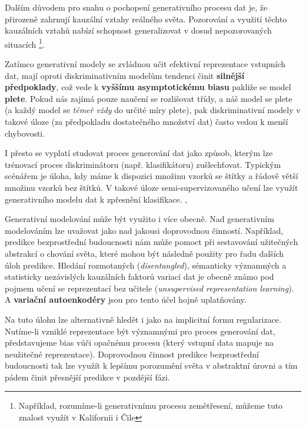 Dalším důvodem pro snahu o pochopení generativního procesu dat je, že přirozeně zahrnují kauzální vztahy reálného světa.
Pozorování a využití těchto kauzálních vztahů nabízí schopnost generalizovat v dosud nepozorovaných situacích
\footnote{Například, rozumíme-li generativnímu procesu zemětřesení, můžeme tuto znalost využít v Kalifornii i Čile}.

Zatímco generativní modely se zvládnou učit efektivní reprezentace vstupních dat, mají oproti diskriminativním modelům tendenci činit \textbf{silnější předpoklady}, což vede k \textbf{vyššímu asymptotickému biasu} pakliže se model \textbf{plete}. \cite{Banerjee2007}
Pokud nás zajímá pouze naučení se rozlišovat třídy, a náš model se plete (a každý model se \emph{témeř vždy} do určité míry plete), pak diskriminativní modely v takové úloze (za předpokladu dostatečného množství dat) často vedou k menší chybovosti.

I přesto se vyplatí studovat proces generování dat jako způsob, kterým lze trénovací proces diskriminátoru (např. klasifikátoru) zušlechťovat.
Typickým scénářem je úloha, kdy máme k dispozici množinu vzorků se štítky a řádově větší množinu vzorků bez štítků.
V takové úloze semi-supervizovaného učení lze využít generativního modelu dat k zpřesnění klasifikace. \cite{Kingma2014}, \cite{Soenderby2016}

Generativní modelování může být využito i více obecně. Nad generativním modelováním lze uvažovat jako nad jakousi doprovodnou činností.
Například, predikce bezprostřední budoucnosti nám může pomoct při sestavování užitečných abstrakcí o chování světa, které mohou být následně použity pro řadu dalších úloh predikce.
Hledání rozmotaných (\emph{disentangled}), sémanticky významných a statisticky nezávislých kauzálních faktorů variací dat je obecně známo pod pojmem učení se reprezentací bez učitele (\emph{unsupervised representation learning}).
A \textbf{variační autoenkodéry} jsou pro tento účel hojně uplatňovány.

Na tuto úlohu lze alternativně hledět i jako na implicitní formu regularizace. Nutíme-li vzniklé reprezentace být významnými pro proces generování dat, představujeme bias vůči opačnému procesu (který vstupní data mapuje na neužitečné reprezentace).
Doprovodnou činnost predikce bezprostřední budoucnosti tak lze využít k lepšímu porozumění světa v abstraktní úrovni a tím pádem činit přesnější predikce v pozdější fázi.

